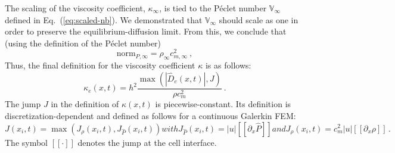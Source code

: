 \documentclass[review]{elsarticle}
\newcommand{\eqt}[1]{Eq.~(\ref{#1})}                     %
\newcommand{\norm}{\textrm{norm}}
\newcommand{\Pe}{\textrm{P\'e}}
\renewcommand{\Pe}{\mathbb{V}_\infty}
\begin{document}
%
The scaling of the viscosity coefficient, $\kappa_\infty$, is tied to the P\'eclet number $\Pe$ defined in \eqt{eq:scaled-nb}. We demonstrated that $\Pe$ should scale as one in order to preserve the equilibrium-diffusion limit. From this, we conclude that (using the definition of the P\'eclet number) 
%
\begin{equation}
\norm_{P,\infty} = \rho_\infty c^2_{m,\infty} \nonumber \ ,
\end{equation}
%
Thus, the final definition for the viscosity coefficient $\kappa$ is as follows:
\begin{equation}
\label{eq:equation12bis}
\kappa_e(x,t) = h^2 \frac{\max (|\hat{D}_e(x,t)|, J)}{\rho c_m^2} \ .
\end{equation} 
The jump $J$ in the definition of $\kappa(x,t)$ is piecewise-constant. Its definition is discretization-dependent and defined as follows for a continuous Galerkin FEM: 
\begin{subequations}
\label{eq:equation12ter}
\begin{equation}
J(x_i,t) = \max( J_{\rho}(x_i,t), J_{\hat{P}}(x_i,t) )
\end{equation}
with
\begin{equation}
J_{\hat{P}}(x_i,t) = |u| [[\partial_x \hat{P}]]
\end{equation}
and
\begin{equation}
J_{\rho}(x_i,t) = c_m^2 |u|  [[\partial_x \rho]] \,.
\end{equation}
\end{subequations}
The symbol $[[ \cdot ]]$ denotes the jump at the cell interface.
\end{document}
